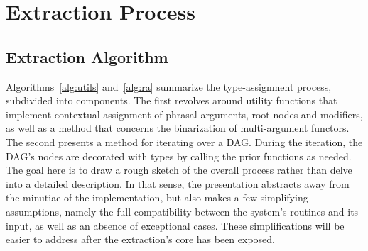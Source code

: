 \section{Extraction Process}

\subsection{Extraction Algorithm}
\label{subsec:extraction_alg}
Algorithms~\ref{alg:utils} and~\ref{alg:ra} summarize the type-assignment process, subdivided into components. 
The first revolves around utility functions that implement contextual assignment of phrasal arguments, root nodes and modifiers, as well as a method that concerns the binarization of multi-argument functors.
The second presents a method for iterating over a DAG.
During the iteration, the DAG's nodes are decorated with types by calling the prior functions as needed.
The goal here is to draw a rough sketch of the overall process rather than delve into a detailed description.
In that sense, the presentation abstracts away from the minutiae of the implementation, but also makes a few simplifying assumptions, namely the full compatibility between the system's routines and its input, as well as an absence of exceptional cases.
These simplifications will be easier to address after the extraction's core has been exposed.

